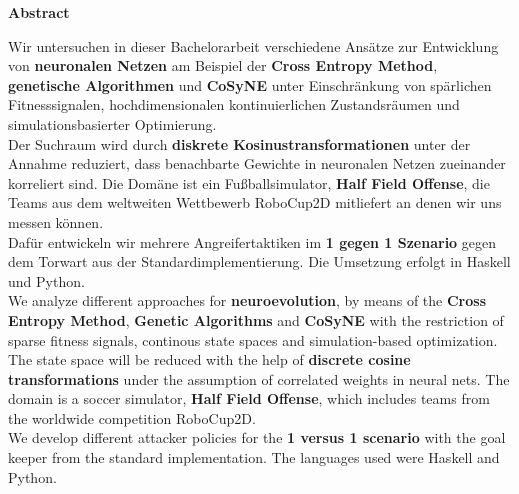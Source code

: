%
%
\vspace*{2cm}

\begin{center}
    \textbf{Abstract}
\end{center}

\vspace*{1cm}

\noindent Wir untersuchen in dieser Bachelorarbeit verschiedene Ansätze zur Entwicklung von \textbf{neuronalen Netzen} am Beispiel der \textbf{Cross Entropy Method}, \textbf{genetische Algorithmen} und \textbf{CoSyNE} unter Einschränkung von spärlichen Fitnesssignalen, hochdimensionalen kontinuierlichen Zustandsräumen und simulationsbasierter Optimierung. \\[2mm]
\noindent
Der Suchraum wird durch \textbf{diskrete Kosinustransformationen} unter der Annahme reduziert, dass benachbarte Gewichte in neuronalen Netzen zueinander korreliert sind. Die Domäne ist ein Fußballsimulator, \textbf{Half Field Offense}, die Teams aus dem weltweiten Wettbewerb RoboCup2D mitliefert an denen wir uns messen können. \\[2mm]
\noindent
Dafür entwickeln wir mehrere Angreifertaktiken im \textbf{1 gegen 1 Szenario} gegen dem Torwart aus der Standardimplementierung. Die Umsetzung erfolgt in Haskell und Python. \\[10mm]


\noindent
We analyze different approaches for \textbf{neuroevolution}, by means of the \textbf{Cross Entropy Method}, \textbf{Genetic Algorithms} and \textbf{CoSyNE} with the restriction of sparse fitness signals, continous state spaces and simulation-based optimization. \\[2mm]
\noindent
The state space will be reduced with the help of \textbf{discrete cosine transformations} under the assumption of correlated weights in neural nets. The domain is a soccer simulator, \textbf{Half Field Offense}, which includes teams from the worldwide competition RoboCup2D. \\[2mm]
\noindent
We develop different attacker policies for the \textbf{1 versus 1 scenario} with the goal keeper from the standard implementation. The languages used were Haskell and Python.






